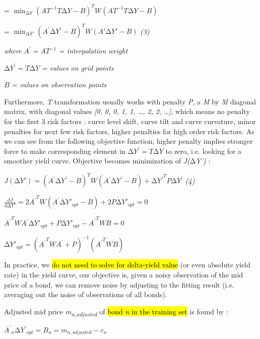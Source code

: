 =
\(\min_{\mathrm{\Delta}Y}\left( AT^{- 1}T\mathrm{\Delta}Y - B \right)^{T}W(AT^{- 1}T\mathrm{\Delta}Y - B)\)

=
\(\min_{\mathrm{\Delta}Y'}\left( A^{'}{\mathrm{\Delta}Y}^{'} - B \right)^{T}W(A'\mathrm{\Delta}Y' - B)\)
\emph{(3)}

\emph{where} \(A^{'} = AT^{- 1}\) \emph{= interpolation weight}

\({\mathrm{\Delta}Y}^{'} = T\mathrm{\Delta}Y\) \emph{= values on grid
points}

\(B\) \emph{= values on observation points}

Furthermore, \emph{T} transformation usually works with penalty
\emph{P}, a \emph{M} by \emph{M} diagonal matrix, with diagonal values
\emph{{[}0, 0, 0, 1, 1, \ldots, 2, 2, \ldots{]}}, which means no penalty
for the first 3 risk factors : curve level shift, curve tilt and curve
curvature, minor penalties for next few risk factors, higher penalties
for high order risk factors. As we can see from the following objective
function, higher penalty implies stronger force to make corresponding
element in \(\mathrm{\Delta}Y^{'} = T\mathrm{\Delta}Y\) to zero, i.e.
looking for a smoother yield curve. Objective becomes minimization of
\emph{J(}\(\mathrm{\Delta}\)\emph{Y')} :

\(J(\mathrm{\Delta}Y') = \left( A^{'}{\mathrm{\Delta}Y}^{'} - B \right)^{T}W\left( A^{'}\mathrm{\Delta}Y^{'} - B \right) + {{\mathrm{\Delta}Y}^{'}}^{T}P\mathrm{\Delta}Y^{'}\)
\emph{(4)}

\(\frac{dJ}{d\mathrm{\Delta}Y'} = {2A^{'}}^{T}W\left( A^{'}\mathrm{\Delta}{Y'}_{opt} - B \right) + 2P\mathrm{\Delta}{Y'}_{opt} = 0\)

\({A^{'}}^{T}WA^{'}{\mathrm{\Delta}Y'}_{opt} + P{\mathrm{\Delta}Y'}_{opt} - {A^{'}}^{T}WB = 0\)

\({\mathrm{\Delta}Y'}_{opt} = \left( {A^{'}}^{T}WA^{'} + P \right)^{- 1}\left( {A^{'}}^{T}WB \right)\)

In practice, we \hl{do not need to solve for delta-yield value} (or even
absolute yield rate) in the yield curve, our objective is, given a noisy
observation of the mid price of a bond, we can remove noise by adjusting
to the fitting result (i.e. averaging out the noise of observations of
all bonds).

Adjusted mid price \emph{m\textsubscript{n,adjusted}} of \hl{bond
\emph{n} in the training set} is found by :

\({A^{'}}_{n}{{\mathrm{\Delta}Y}^{'}}_{opt} = B_{n} = m_{n,adjusted} - c_{n}\)

